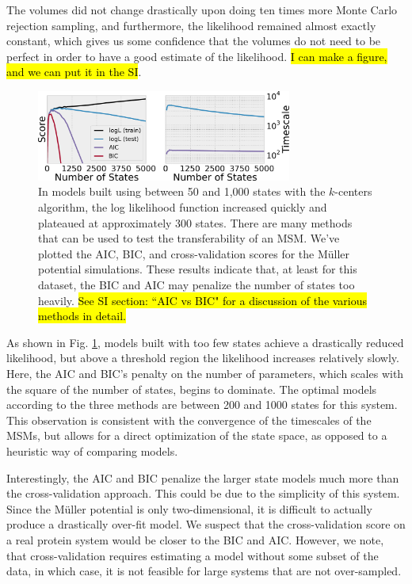 \documentclass[twocolumn,floatfix,nofootinbib,aps]{revtex4-1}
\begin{document}
The volumes did not change drastically upon doing ten times more Monte Carlo rejection sampling, and furthermore, the likelihood remained almost exactly constant, which gives us some confidence that the volumes do not need to be perfect in order to have a good estimate of the likelihood. \hl{I can make a figure, and we can put it in the SI}.

\begin{figure}[h]
\centering
\includegraphics[width=3.3in]{figs/mull_cross.png}
\caption{In models built using between 50 and 1,000 states with the $k$-centers algorithm, the log likelihood function increased quickly and plateaued at approximately 300 states. There are many methods that can be used to test the transferability of an MSM. We've plotted the AIC, BIC, and cross-validation scores for the M\"uller potential simulations. These results indicate that, at least for this dataset, the BIC and AIC may penalize the number of states too heavily. \hl{See SI section: ``AIC vs BIC" for a discussion of the various methods in detail.}}
\label{fig:mullerlike}
\end{figure}

As shown in Fig. \ref{fig:mullerlike}, models built with too few states achieve a drastically reduced likelihood, but above a threshold region the likelihood increases relatively slowly. Here, the AIC and BIC's penalty on the number of parameters, which scales with the square of the number of states, begins to dominate. The optimal models according to the three methods are between 200 and 1000 states for this system. This observation is consistent with the convergence of the timescales of the MSMs, but allows for a direct optimization of the state space, as opposed to a heuristic way of comparing models.

Interestingly, the AIC and BIC penalize the larger state models much more than the cross-validation approach. This could be due to the simplicity of this system. Since the M\"uller potential is only two-dimensional, it is difficult to actually produce a drastically over-fit model. We suspect that the cross-validation score on a real protein system would be closer to the BIC and AIC. However, we note, that cross-validation requires estimating a model without some subset of the data, in which case, it is not feasible for large systems that are not over-sampled.
\end{document}
